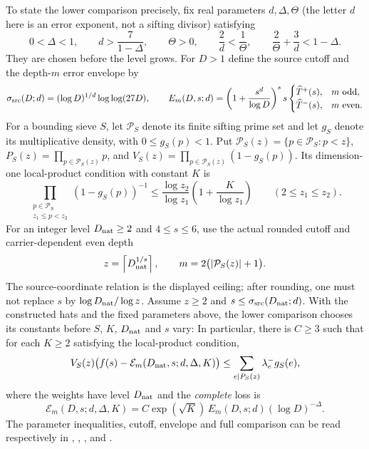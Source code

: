 To state the lower comparison precisely, fix real parameters $d,\Delta,\Theta$
(the letter $d$ here is an error exponent, not a sifting divisor) satisfying
\[
 0<\Delta<1,\qquad d>\frac7{1-\Delta},\qquad \Theta>0,
 \qquad \frac2d<\frac1\Theta,\qquad
 \frac2\Theta+\frac3d<1-\Delta.
\]
They are chosen before the level grows. For $D>1$ define the source cutoff
and the depth-$m$ error envelope by
\[
 \sigma_{\rm src}(D;d)=(\log D)^{1/d}\log\log(27D),
 \qquad
 E_m(D,s;d)=\left(1+\frac{s^d}{\log D}\right)^s s
 \begin{cases}\widehat T^+(s),&m\text{ odd},\\
 \widehat T^-(s),&m\text{ even}.
 \end{cases}
\]
For a bounding sieve $S$, let $\mathcal P_S$ denote its finite sifting prime
set and let $g_S$ denote its multiplicative density, with $0\le g_S(p)<1$.
Put $\mathcal P_S(z)=\{p\in\mathcal P_S:p<z\}$,
$P_S(z)=\prod_{p\in\mathcal P_S(z)}p$, and
$V_S(z)=\prod_{p\in\mathcal P_S(z)}(1-g_S(p))$.
Its dimension-one local-product condition with constant $K$ is
\[
 \prod_{\substack{p\in\mathcal P_S\\z_1\le p<z_2}}
 (1-g_S(p))^{-1}
 \le\frac{\log z_2}{\log z_1}\left(1+\frac K{\log z_1}\right)
 \qquad(2\le z_1\le z_2).
\]
For an integer level $D_{\rm nat}\ge2$ and $4\le s\le6$, use the actual
rounded cutoff and carrier-dependent even depth
\[
 z=\left\lceil D_{\rm nat}^{1/s}\right\rceil,\qquad
 m=2\bigl(|\mathcal P_S(z)|+1\bigr).
\]
The source-coordinate relation is the displayed ceiling; after rounding,
one must not replace $s$ by $\log D_{\rm nat}/\log z$.
Assume $z\ge2$ and $s\le\sigma_{\rm src}(D_{\rm nat};d)$.
With the constructed hats and the fixed parameters above, the lower
comparison chooses its constants before $S$, $K$, $D_{\rm nat}$ and $s$ vary:
In particular, there is $C\ge3$ such that for each $K\ge2$ satisfying the
local-product condition,
\[
 V_S(z)\bigl(f(s)-\mathcal E_m(D_{\rm nat},s;d,\Delta,K)\bigr)
 \le \sum_{e\mid P_S(z)}\lambda_e^-g_S(e),
\]
where the weights have level $D_{\rm nat}$ and the \emph{complete} loss is
\[
 \mathcal E_m(D,s;d,\Delta,K)
 =C\exp(\sqrt K)\,E_m(D,s;d)(\log D)^{-\Delta}.
\]
The parameter inequalities, cutoff, envelope and full comparison can be
read respectively in
,
,
, and
.


